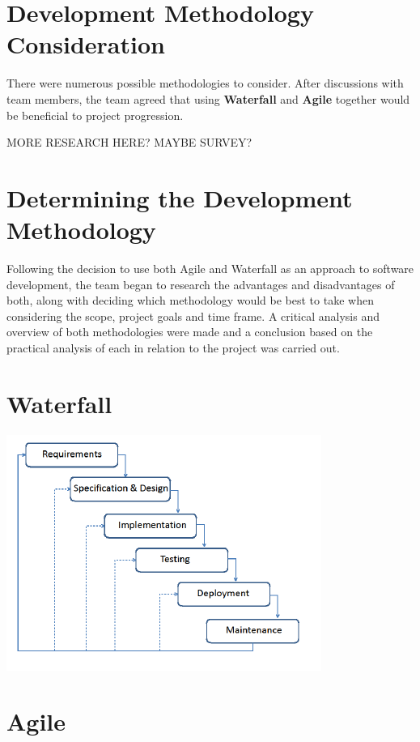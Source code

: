 \section{Development Methodology Consideration}
There were numerous possible methodologies to consider. After discussions with team members, the team agreed that using \textbf{Waterfall} and \textbf{Agile} together would be beneficial to project progression. 


\vspace{70mm} %

MORE RESEARCH HERE? MAYBE SURVEY?


\section{Determining the Development Methodology}
Following the decision to use both Agile and Waterfall as an approach to software development, the team began to research the advantages and disadvantages of both, along with deciding which methodology would be best to take when considering the scope, project goals and time frame. A critical analysis and overview of both methodologies were made and a conclusion based on the practical analysis of each in relation to the project was carried out.

\section{Waterfall}

 \begin{center}    
      \includegraphics[scale=0.9]{img/Waterfall.png}
\end{center}

\section{Agile}

